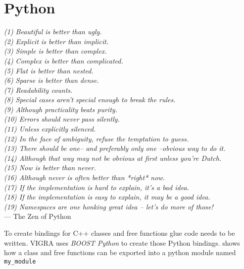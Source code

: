 \section{Python}\label{sec:graph_lib_python}

\begin{scriptsize}
\begin{flushright}{\slshape    
(1) Beautiful is better than ugly. \\ \label{cit:line_a}
(2) Explicit is better than implicit. \\ \label{cit:line_b}
(3) Simple is better than complex. \\
(4) Complex is better than complicated. \\
(5) Flat is better than nested. \\
(6) Sparse is better than dense. \\
(7) Readability counts. \\
(8) Special cases aren't special enough to break the rules. \\
(9) Although practicality beats purity. \\
(10) Errors should never pass silently. \\
(11) Unless explicitly silenced. \\
(12) In the face of ambiguity, refuse the temptation to guess. \\
(13) There should be one-- and preferably only one --obvious way to do it. \\
(14) Although that way may not be obvious at first unless you're Dutch. \\
(15) Now is better than never. \\
(16) Although never is often better than *right* now. \\
(17) If the implementation is hard to explain, it's a bad idea. \\
(18) If the implementation is easy to explain, it may be a good idea. \\
(19) Namespaces are one honking great idea -- let's do more of those! } \\ \medskip
--- The Zen of Python
\end{flushright}
\end{scriptsize}


To create bindings for C++ classes and free functions glue code needs to 
be written. VIGRA\citep{ software_vigra,koethe_2000_phd_thesis} uses \emph{BOOST Python}\citep{ boost_python}  to create those Python bindings.
 shows how a  class and free functions can
be exported into a python module named \lstinline{my_module}

